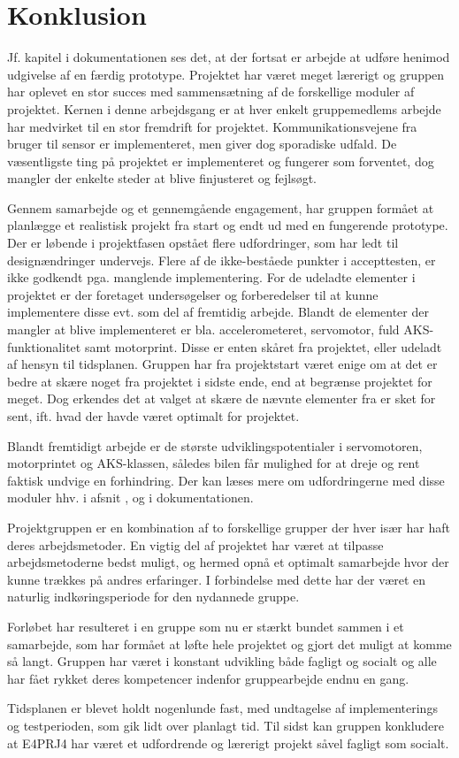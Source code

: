 \chapter{Konklusion}
\label{ch:Konklusion}

Jf. kapitel  i dokumentationen ses det, at der fortsat er arbejde at udføre henimod udgivelse af en færdig prototype.
Projektet har været meget lærerigt og gruppen har oplevet en stor succes med sammensætning af de forskellige moduler af projektet. 
Kernen i denne arbejdsgang er at hver enkelt gruppemedlems arbejde har medvirket til en stor fremdrift for projektet. 
Kommunikationsvejene fra bruger til sensor er implementeret, men giver dog sporadiske udfald. 
De væsentligste ting på projektet er implementeret og fungerer som forventet, dog mangler der enkelte steder at blive finjusteret og fejlsøgt. 

Gennem samarbejde og et gennemgående engagement, har gruppen formået at planlægge et realistisk projekt fra start og endt ud med en fungerende prototype. 
Der er løbende i projektfasen opstået flere udfordringer, som har ledt til  designændringer undervejs. 
Flere af de ikke-beståede punkter i accepttesten, er ikke godkendt pga. manglende implementering. 
For de udeladte elementer i projektet er der foretaget undersøgelser og forberedelser til at kunne implementere disse evt. som del af fremtidig arbejde. 
Blandt de elementer der mangler at blive implementeret er bla. accelerometeret, servomotor, fuld AKS-funktionalitet samt motorprint. 
Disse er enten skåret fra projektet, eller udeladt af hensyn til tidsplanen. 
Gruppen har fra projektstart været enige om at det er bedre at skære noget fra projektet i sidste ende, end at begrænse projektet for meget. 
Dog erkendes det at valget at skære de nævnte elementer fra er sket for sent, ift. hvad der havde været optimalt for projektet.

Blandt fremtidigt arbejde er de største udviklingspotentialer i servomotoren, motorprintet og AKS-klassen, således bilen får mulighed for at dreje og rent faktisk undvige en forhindring. 
Der kan læses mere om udfordringerne med disse moduler hhv. i afsnit ,  og  i dokumentationen. 

Projektgruppen er en kombination af to forskellige grupper der hver især har haft deres arbejdsmetoder.
En vigtig del af projektet har været at  tilpasse arbejdsmetoderne bedst muligt, og hermed opnå et optimalt samarbejde hvor der kunne trækkes på andres erfaringer. 
I forbindelse med dette har der været en naturlig indkøringsperiode for den nydannede gruppe.

Forløbet har resulteret i en gruppe som nu er stærkt bundet sammen i et samarbejde, som har formået at løfte hele projektet og gjort det muligt at komme så langt. 
Gruppen har været i konstant udvikling både fagligt og socialt og alle har fået rykket deres kompetencer indenfor gruppearbejde endnu en gang.

Tidsplanen er blevet holdt nogenlunde fast, med undtagelse af implementerings og testperioden, som gik lidt over planlagt tid. 
Til sidst kan gruppen konkludere at E4PRJ4 har været et udfordrende og lærerigt projekt såvel fagligt som socialt.

\clearpage